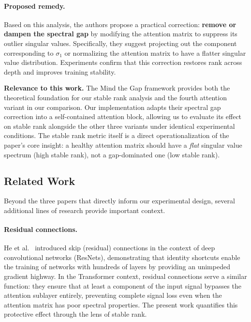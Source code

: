 \documentclass[12pt, a4paper]{article}
\begin{document}
\paragraph{Proposed remedy.}
Based on this analysis, the authors propose a practical correction:
\textbf{remove or dampen the spectral gap} by modifying the attention
matrix to suppress its outlier singular values. Specifically, they suggest
projecting out the component corresponding to $\sigma_1$ or normalizing
the attention matrix to have a flatter singular value distribution.
Experiments confirm that this correction restores rank across depth and
improves training stability.

\textbf{Relevance to this work.} The Mind the Gap framework provides
both the theoretical foundation for our stable rank analysis and the
fourth attention variant in our comparison. Our implementation adapts
their spectral gap correction into a self-contained attention block,
allowing us to evaluate its effect on stable rank alongside the other
three variants under identical experimental conditions. The stable rank
metric itself is a direct operationalization of the paper's core
insight: a healthy attention matrix should have a \textit{flat} singular
value spectrum (high stable rank), not a gap-dominated one (low stable
rank).

\subsection{Related Work}

Beyond the three papers that directly inform our experimental design,
several additional lines of research provide important context.

\paragraph{Residual connections.}
He et al.~\cite{he2016residual} introduced skip (residual) connections in the
context of deep convolutional networks (ResNets), demonstrating that
identity shortcuts enable the training of networks with hundreds of
layers by providing an unimpeded gradient highway. In the Transformer
context, residual connections serve a similar function: they ensure that
at least a component of the input signal bypasses the attention sublayer
entirely, preventing complete signal loss even when the attention matrix
has poor spectral properties. The present work quantifies this
protective effect through the lens of stable rank.
\end{document}

